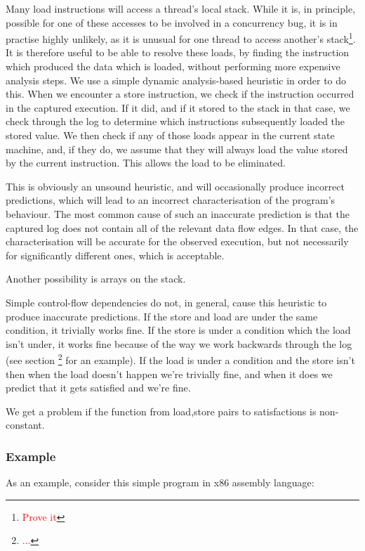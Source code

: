 \documentclass[10pt,twocolumn,preprint,natbib,authoryear]{sigplanconf}
\newcommand{\editorial}[1]{\textcolor{red}{\footnote{\textcolor{red}{#1}}}}
\begin{document}
Many load instructions will access a thread's local stack.  While it
is, in principle, possible for one of these accesses to be involved in
a concurrency bug, it is in practise highly unlikely, as it is unusual
for one thread to access another's stack\editorial{Prove it}.  It is
therefore useful to be able to resolve these loads, by finding the
instruction which produced the data which is loaded, without
performing more expensive analysis steps.  We use a simple dynamic
analysis-based heuristic in order to do this.  When we encounter a
store instruction, we check if the instruction occurred in the
captured execution.  If it did, and if it stored to the stack in that
case, we check through the log to determine which instructions
subsequently loaded the stored value.  We then check if any of those
loads appear in the current state machine, and, if they do, we assume
that they will always load the value stored by the current
instruction.  This allows the load to be eliminated.

This is obviously an unsound heuristic, and will occasionally produce
incorrect predictions, which will lead to an incorrect
characterisation of the program's behaviour.  The most common cause of
such an inaccurate prediction is that the captured log does not
contain all of the relevant data flow edges.  In that case, the
characterisation will be accurate for the observed execution, but not
necessarily for significantly different ones, which is acceptable.

Another possibility is arrays on the stack.

Simple control-flow dependencies do not, in general, cause this
heuristic to produce inaccurate predictions.  If the store and load
are under the same condition, it trivially works fine.  If the store
is under a condition which the load isn't under, it works fine because
of the way we work backwards through the log (see section
\editorial{...} for an example).  If the load is under a condition and
the store isn't then when the load doesn't happen we're trivially
fine, and when it does we predict that it gets satisfied and we're
fine.

We get a problem if the function from load,store pairs to
satisfactions is non-constant.

\subsubsection{Example}

As an example, consider this simple program in x86 assembly language:
\end{document}
